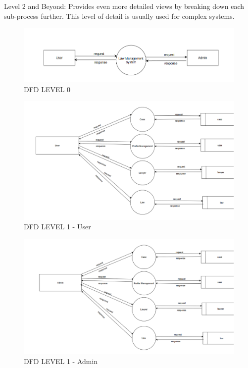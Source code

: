Level 2 and Beyond: Provides even more detailed views by breaking down each sub-process further. This level of detail is usually used for complex systems.



\begin{figure}
  \centering
  \includegraphics[width=0.8\linewidth]{LawDFD0.png}
 \caption{DFD LEVEL 0}
   \label{fig:DFD LEVEL 0}
\end{figure}


\begin{figure}
  \centering
  \includegraphics[width=0.8\linewidth]{LawDFD1User.png}
 \caption{DFD LEVEL 1 - User}
   \label{fig:DFD LEVEL 1 - User}
\end{figure}

\begin{figure}
  \centering
  \includegraphics[width=0.8\linewidth]{LawDFD1Admin.png}
 \caption{DFD LEVEL 1 - Admin}
   \label{fig:DFD LEVEL 1 - Admin}
\end{figure}

